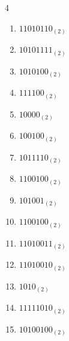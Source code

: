\begin{multicols}{4}
\begin{enumerate}
        \phantom{$=83$}

  \item $11010110_{(2)}$

        \phantom{$=214$}

\columnbreak %

  \item $10101111_{(2)}$

        \phantom{$=175$}

  \item $1010100_{(2)}$

        \phantom{$=84$}

  \item $111100_{(2)}$

        \phantom{$=60$}

  \item $10000_{(2)}$

        \phantom{$=16$}

  \item $100100_{(2)}$

        \phantom{$=36$}

  \item $1011110_{(2)}$

        \phantom{$=94$}

  \item $1100100_{(2)}$

        \phantom{$=100$}

  \item $101001_{(2)}$

        \phantom{$=41$}

  \item $1100100_{(2)}$

        \phantom{$=100$}

  \item $11010011_{(2)}$

        \phantom{$=211$}

  \item $11010010_{(2)}$

        \phantom{$=210$}

  \item $1010_{(2)}$

        \phantom{$=10$}

  \item $11111010_{(2)}$

        \phantom{$=250$}

  \item $10100100_{(2)}$


\end{enumerate}
\end{multicols}
